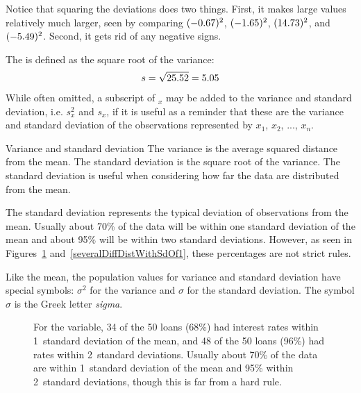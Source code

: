 Notice that squaring the deviations does two things.
First, it makes large values relatively much larger,
seen by comparing $(-0.67)^2$, $(-1.65)^2$, $(14.73)^2$,
and $(-5.49)^2$.
Second, it gets rid of any negative signs.

The  is defined as the square root of the variance:
\begin{align*}
s = \sqrt{25.52{}} = 5.05{}
\end{align*}
While often omitted, a subscript of $_x$ may be added
to the variance and standard deviation,
i.e. $s_x^2$ and $s_x^{}$, if it is useful as a reminder
that these are the variance and standard deviation of the
observations represented by $x_1^{}$, $x_2^{}$, ..., $x_n^{}$.

\begin{onebox}{Variance and standard deviation}
  The variance is the average squared distance from the mean.
  The standard deviation is the square root of the variance.
  The standard deviation is useful when considering how far
  the data are distributed from the mean.\vspace{3mm}

  The standard deviation represents the typical deviation
  of observations from the mean.
  Usually about 70\% of the data will be within one standard
  deviation of the mean and about 95\% will be within two
  standard deviations.
  However, as seen in Figures~\ref{sdRuleForIntRate}
  and~\ref{severalDiffDistWithSdOf1}, these percentages are
  not strict rules.
\end{onebox}

Like the mean, the population values for variance
and standard deviation have special symbols:
$\sigma_{}^2$ for the variance and $\sigma$ for the
standard deviation.
The symbol $\sigma$
is the Greek letter \emph{sigma}.

\begin{figure}[h]
  \centering
  \caption{For the  variable,
      34 of the 50 loans (68\%) had interest rates within
      1~standard deviation of the mean,
      and 48 of the 50 loans (96\%) had rates within
      2~standard deviations.
      Usually about 70\% of the data are within 1~standard
      deviation of the mean and 95\% within 2~standard
      deviations, though this is far from a hard rule.}
  \label{sdRuleForIntRate}
\end{figure}

